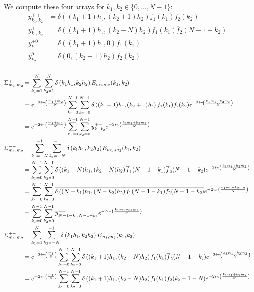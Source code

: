 We compute these four arrays for $k_1,k_2\in\{0,\hdots,N-1\}$:
\begin{align*}
y^{++}_{k_1,k_2}&=\delta((k_1+1)h_1,(k_2+1)h_2) f_1(k_1) f_2(k_2) \\
y^{+-}_{k_1,k_2}&=\delta((k_1+1)h_1,(k_2-N)h_2) f_1(k_1) \overline{f}_2(N-1-k_2) \\
y^{+0}_{k_1}&=\delta((k_1+1)h_1,0) f_1(k_1) \\
y^{0+}_{k_2}&=\delta(0,(k_2+1)h_2) f_2(k_2) \\
\end{align*}

\begin{align}
\Sigma_{m_1,m_2}^{++}&=\sum_{k_1=1}^{N}\sum_{k_2=1}^{N}\delta\left(k_1h_1,k_2h_2\right)E_{m_1,m_2}(k_1,k_2) \notag\\
  &=e^{-2i\pi\left(\frac{m_1+m_2}{N}\right)} \sum_{k_1=0}^{N-1}\sum_{k_2=0}^{N-1} \delta\left((k_1+1)h_1,(k_2+1)h_2\right) f_1(k_1) f_2(k_2) e^{-2i\pi\left(\frac{k_1m_1+k_2m_2}{N}\right)} \notag\\
  &=e^{-2i\pi\left(\frac{m_1+m_2}{N}\right)} \sum_{k_1=0}^{N-1}\sum_{k_2=0}^{N-1} y^{++}_{k_1,k_2} e^{-2i\pi\left(\frac{k_1m_1+k_2m_2}{N}\right)} \\
\Sigma_{m_1,m_2}^{--}&=\sum_{k_1=-N}^{-1}\sum_{k_2=-N}^{-1}\delta\left(k_1h_1,k_2h_2\right)E_{m_1,m_2}(k_1,k_2) \notag\\
  &= \sum_{k_1=0}^{N-1}\sum_{k_2=0}^{N-1}\delta\left((k_1-N)h_1,(k_2-N)h_2\right) \overline{f}_1(N-1-k_1)\overline{f}_2(N-1-k_2) e^{-2i\pi\left(\frac{k_1m_1+k_2m_2}{N}\right)} \notag\\
  &= \sum_{k_1=0}^{N-1}\sum_{k_2=0}^{N-1}\overline{\delta\left((N-k_1)h_1,(N-k_2)h_2\right) f_1(N-1-k_1)f_2(N-1-k_2)} e^{-2i\pi\left(\frac{k_1m_1+k_2m_2}{N}\right)} \notag\\
  &= \sum_{k_1=0}^{N-1}\sum_{k_2=0}^{N-1}\overline{y}^{++}_{N-1-k_1,N-1-k_2} e^{-2i\pi\left(\frac{k_1m_1+k_2m_2}{N}\right)} \\
\Sigma_{m_1,m_2}^{+-}&=\sum_{k_1=1}^{N}\sum_{k_2=-N}^{-1}\delta\left(k_1h_1,k_2h_2\right)E_{m_1,m_2}(k_1,k_2) \notag\\
  &=e^{-2i\pi\left(\frac{m_1}{N}\right)} \sum_{k_1=0}^{N-1}\sum_{k_2=0}^{N-1} \delta\left((k_1+1)h_1,(k_2-N)h_2\right) f_1(k_1) \overline{f}_2(N-1-k_2) e^{-2i\pi\left(\frac{k_1m_1+k_2m_2}{N}\right)} \notag\\
  &=e^{-2i\pi\left(\frac{m_1}{N}\right)} \sum_{k_1=0}^{N-1}\sum_{k_2=0}^{N-1} \delta\left((k_1+1)h_1,(k_2-N)h_2\right) f_1(k_1) f_2(k_2-1-N) e^{-2i\pi\left(\frac{k_1m_1+k_2m_2}{N}\right)} \notag\\

\end{align}
